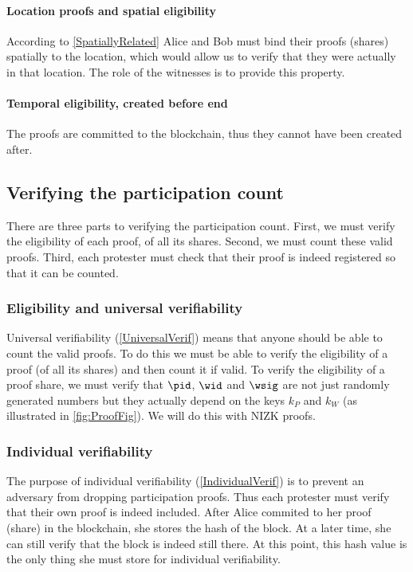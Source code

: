 \paragraph{Location proofs and spatial eligibility}

According to \cref{SpatiallyRelated} Alice and Bob must bind their proofs 
(shares) spatially to the location, which would allow us to verify that they 
were actually in that location.
The role of the witnesses is to provide this property.

\paragraph{Temporal eligibility, created before end}

The proofs are committed to the blockchain, thus they cannot have been created 
after.

\subsection{Verifying the participation count}

There are three parts to verifying the participation count.
First, we must verify the eligibility of each proof, \ie of all its shares.
Second, we must count these valid proofs.
Third, each protester must check that their proof is indeed registered so that 
it can be counted.

\subsubsection{Eligibility and universal verifiability}

Universal verifiability (\cref{UniversalVerif}) means that anyone should be able 
to count the valid proofs.
To do this we must be able to verify the eligibility of a proof (\ie of all 
its shares) and then count it if valid.
To verify the eligibility of a proof share, we must verify that \(\pid\), \(\wid\) 
and \(\wsig\) are not just randomly generated numbers but they actually depend on 
the keys \(k_P\) and \(k_W\) (as illustrated in \cref{fig:ProofFig}).
We will do this with \ac{NIZK} proofs.

\subsubsection{Individual verifiability}

The purpose of individual verifiability (\cref{IndividualVerif}) is to prevent 
an adversary from dropping participation proofs.
Thus each protester must verify that their own proof is indeed included.
After Alice commited to her proof (share) in the blockchain, she stores the hash 
of the block.
At a later time, she can still verify that the block is indeed still there.
At this point, this hash value is the only thing she must store for individual 
verifiability.

